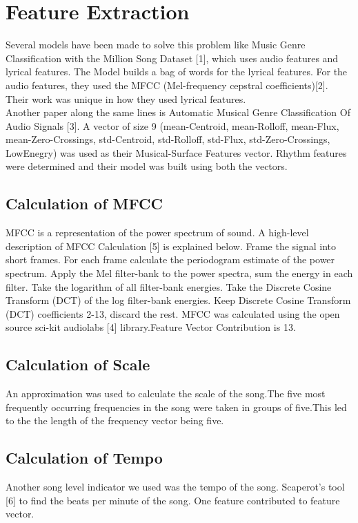 \documentclass[conference]{IEEEtran}
\begin{document}
                        \section{Feature Extraction}
                        Several models have been made to solve this problem like Music Genre Classification with the Million Song Dataset [1], which uses audio features and lyrical features. The Model builds a bag of words for the lyrical features. For the audio features, they used the MFCC (Mel-frequency cepstral coefficients)[2]. Their work was unique in how they used lyrical features.
                        \\
                            Another paper along the same lines is Automatic Musical Genre Classification Of Audio Signals [3]. A vector of size 9 (mean-Centroid, mean-Rolloff, mean-Flux, mean-Zero-Crossings, std-Centroid, std-Rolloff, std-Flux, std-Zero-Crossings, LowEnegry) was used as their Musical-Surface Features vector. Rhythm features were determined and their model was built using both the vectors.

                            \subsection{Calculation of MFCC}
                            MFCC is a representation of the power spectrum of sound. A high-level description of MFCC Calculation [5] is explained below. Frame the signal into short frames. For each frame calculate the periodogram estimate of the power spectrum. Apply the Mel filter-bank to the power spectra, sum the energy in each filter. Take the logarithm of all filter-bank energies. Take the Discrete Cosine Transform (DCT) of the log filter-bank energies. Keep Discrete Cosine Transform (DCT) coefficients 2-13, discard the rest. MFCC  was calculated using the open source sci-kit  audiolabs [4] library.Feature Vector Contribution is 13.


                            \subsection{Calculation of Scale}
                            An approximation was used  to calculate the scale of the song.The five most frequently occurring frequencies in the song were taken  in groups of five.This led to the the length of the frequency vector being five.


                            \subsection{Calculation of Tempo}
                            Another song level indicator we used was the tempo of the song. Scaperot's  tool [6] to find the beats per minute  of the song. One feature contributed to feature vector.
\end{document}
